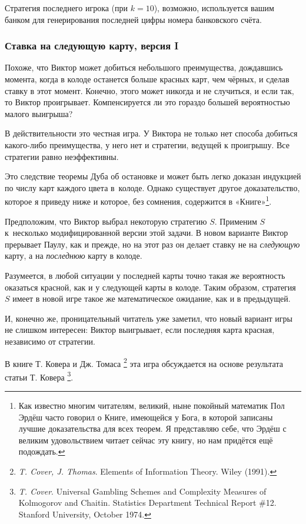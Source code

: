 \documentclass[twoside]{book}
\begin{document}
Стратегия последнего игрока (при $k=10$), возможно, используется вашим банком для генерирования последней цифры номера банковского счёта.

\subsubsection*{Ставка на следующую карту, версия I}%

Похоже, что Виктор может добиться небольшого преимущества, дождавшись
момента, когда в колоде останется больше красных карт, чем чёрных, и
сделав ставку в этот момент.
Конечно, этого может никогда и не случиться, и если так, то Виктор проигрывает.
Компенсируется ли это гораздо большей вероятностью малого выигрыша?

В действительности это честная игра.
У Виктора не только нет способа добиться какого-либо преимущества, у
него нет и стратегии, ведущей к проигрышу.
Все стратегии равно неэффективны.

Это следствие теоремы Дуба об остановке %
и может быть легко доказан индукцией по числу карт каждого цвета в~колоде.
Однако существует другое доказательство, которое я приведу ниже и которое, без сомнения, содержится в «Книге»\footnote{Как известно многим читателям, великий, ныне покойный математик Пол Эрдёш часто говорил о Книге, имеющейся у Бога, в которой записаны лучшие доказательства для всех теорем.
Я представляю себе, что Эрдёш с великим удовольствием читает сейчас эту книгу, но нам придётся ещё подождать.}.

Предположим, что Виктор выбрал некоторую стратегию $S$.
Применим $S$ к~несколько модифицированной версии этой задачи.
В новом варианте Виктор прерывает Паулу, как и прежде, но на этот раз он делает ставку не на \emph{следующую} карту, а на \emph{последнюю} карту в колоде.

Разумеется, в любой ситуации у последней карты точно такая же вероятность оказаться красной, как и у следующей карты в колоде.
Таким образом, стратегия $S$ имеет в новой игре такое же
математическое ожидание, как и в предыдущей.

И, конечно же, проницательный читатель уже заметил, что новый вариант
игры не слишком интересен:
Виктор выигрывает, если последняя карта красная, независимо от стратегии.
\heart

\medskip
В книге Т. Ковера и Дж. Томаса%
\footnote{\emph{T. Cover, J. Thomas}. {Elements of Information Theory}. Wiley (1991).} 
эта игра обсуждается на основе результата статьи Т. Ковера%
\footnote{\emph{T. Cover}. Universal Gambling Schemes and Complexity Measures of Kolmogorov and Chaitin. %
{Statistics Department Technical Report \#12}. Stanford University, October 1974.}.
\end{document}

